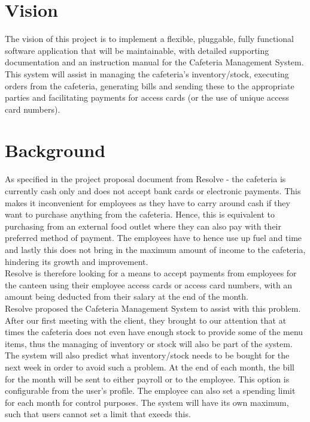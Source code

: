 \documentclass[a4paper,12pt]{article}
\begin{document}
\section{Vision}
The vision of this project is to implement a flexible, pluggable, fully functional software application that will be maintainable, with detailed supporting documentation and an instruction manual for the Cafeteria Management System. This system will assist in managing the cafeteria's inventory/stock, executing orders from the cafeteria, generating bills and sending these to the appropriate parties and facilitating payments for access cards (or the use of unique access card numbers). 

\section{Background}
As specified in the project proposal document from Resolve - the cafeteria is currently cash only and does not accept bank cards or electronic payments. This makes it inconvenient for employees as they have to carry around cash if they want to purchase anything from the cafeteria. Hence, this is equivalent to purchasing from an external food outlet where they can also pay with their preferred method of payment. The employees have to hence use up fuel and time and lastly this does not bring in the maximum amount of income to the cafeteria, hindering its growth and improvement.\\

Resolve is therefore looking for a means to accept payments from employees for the canteen using their employee access cards or access card numbers, with an amount being deducted from their salary at the end of the month.\\

Resolve proposed the Cafeteria Management System to assist with this problem.
After our first meeting with the client, they brought to our attention that at times the cafeteria does not even have enough stock to provide some of the menu items, thus the managing of inventory or stock will also be part of the system. The system will also predict what inventory/stock needs to be bought for the next week in order to avoid such a problem. At the end of each month, the bill for the month will be sent to either payroll or to the employee. This option is configurable from the user's profile. The employee can also set a spending limit for each month for control purposes. The system will have its own maximum, such that users cannot set a limit that exeeds this. 
\end{document}
